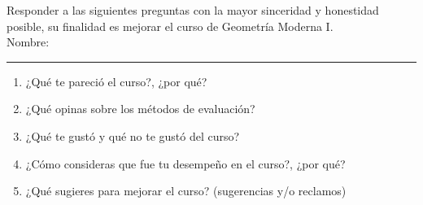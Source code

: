 \documentclass[12pt]{report}
\numberwithin{section}{chapter}
\begin{document}
Responder a las siguientes preguntas con la mayor sinceridad y honestidad posible, su finalidad es mejorar el curso de Geometría Moderna I.\\

Nombre: \rule{16cm}{0.1mm}

\begin{enumerate}
\item ¿Qué te pareció el curso?, ¿por qué?
\vspace{3cm}
\item ¿Qué opinas sobre los métodos de evaluación?
\vspace{3cm}
\item ¿Qué te gustó y qué no te gustó del curso?
\vspace{3cm}
\item ¿Cómo consideras que fue tu desempeño en el curso?, ¿por qué?
\vspace{3cm}
\item ¿Qué sugieres para mejorar el curso? (sugerencias y/o reclamos)
\end{enumerate}
\end{document}
